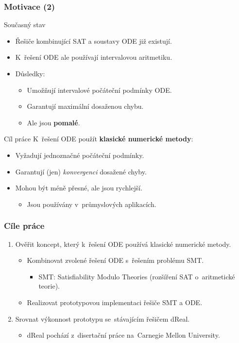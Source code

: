 \documentclass[t]{beamer}
\begin{document}
\begin{frame}\frametitle{Motivace (2)}
\begin{block}{Současný stav}
\begin{itemize}
\item Řešiče kombinující SAT a soustavy ODE již existují.
\item K~řešení ODE ale používají intervalovou aritmetiku.
\item Důsledky:
   \begin{itemize}
   \item Umožňují intervalové počáteční podmínky ODE.
   \item Garantují maximální dosaženou chybu.
   \item Ale jsou \textbf{pomalé}.
   \end{itemize}
\end{itemize}
\end{block} %

\vfill

\begin{exampleblock}{Cíl práce}
K~řešení ODE použít \textbf{klasické numerické metody}:
\begin{itemize}
\item Vyžadují jednoznačné počáteční podmínky.
\item Garantují (jen) \textit{konvergenci} dosažené chyby.
\item Mohou být méně přesné, ale jsou rychlejší.
   \begin{itemize}
   \item Jsou používány v~průmyslových aplikacích.
   \end{itemize}
\end{itemize}
\end{exampleblock} %
\end{frame}


\begin{frame}\frametitle{Cíle práce}
\begin{enumerate}
\item Ověřit koncept, který k~řešení ODE používá
   klasické numerické metody.
   \begin{itemize}
   \item Kombinovat zvolené řešení ODE s~řešením problému SMT.
      \begin{itemize}
      \item SMT: Satisfiability Modulo Theories
         (rozšíření SAT o~aritmetické teorie).
      \end{itemize}
   \item Realizovat prototypovou implementaci řešiče SMT a ODE.
   \end{itemize}
\item Srovnat výkonnost prototypu se~stávajícím řešičem dReal.
   \begin{itemize}
   \item dReal pochází z~disertační práce na~Carnegie Mellon University.
   \end{itemize}
\end{enumerate}
\end{frame}
\end{document}
